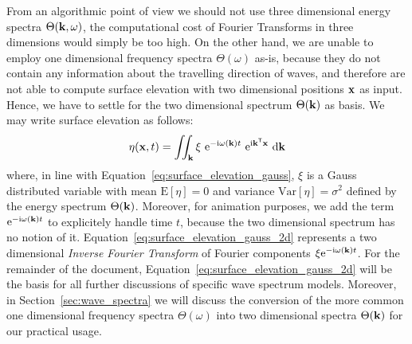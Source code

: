 From an algorithmic point of view we should not use three dimensional
energy spectra $\Theta(\mathbf{k},\omega)$, the computational cost of
Fourier Transforms in three dimensions would simply be too high.
On the other hand, we are unable to employ one dimensional frequency spectra
$\Theta(\omega)$ as-is, because they do not contain any information about
the  travelling direction of waves, and therefore are not able to compute 
surface elevation with two dimensional positions $\mathbf{x}$ as input.
Hence, we have to settle for the two dimensional \wavenumber spectrum
$\Theta(\mathbf{k})$ as basis. We may write surface elevation as follows:
\begin{equation}
\label{eq:surface_elevation_gauss_2d}
 \eta(\mathbf{x}, t) = \iint_{\mathbf{k}} 
\xi~\mathrm{e}^{-\mathrm{i}\omega(\mathbf{k}) t}
~\mathrm{e}^{\mathrm{i}\mathbf{k}^{\mathsf{T}}\mathbf{x}}~\mathrm{d}\mathbf{k}
\end{equation}
where, in line with Equation~\ref{eq:surface_elevation_gauss}, $\xi$ is 
a Gauss distributed variable with mean $\mathrm{E}[\eta] = 0$ and
variance $\mathrm{Var}[\eta] = \sigma^2$ defined by the energy spectrum
$\Theta(\mathbf{k})$. Moreover, for animation purposes, we add the term 
$\mathrm{e}^{-\mathrm{i}\omega(\mathbf{k}) t}$ to explicitely handle 
time $t$, because the two dimensional \wavenumber spectrum has no notion of 
it. Equation~\ref{eq:surface_elevation_gauss_2d} represents a two dimensional 
\emph{Inverse Fourier Transform} of Fourier components 
$\xi\mathrm{e}^{-\mathrm{i}\omega(\mathbf{k}) t}$. For the remainder of the 
document, Equation~\ref{eq:surface_elevation_gauss_2d} will be the basis for all 
further discussions of specific wave spectrum models. Moreover, in 
Section~\ref{sec:wave_spectra} we will discuss the conversion of the 
more common one dimensional frequency spectra $\Theta(\omega)$ into two 
dimensional \wavenumber spectra $\Theta(\mathbf{k})$ for our practical usage.
%
